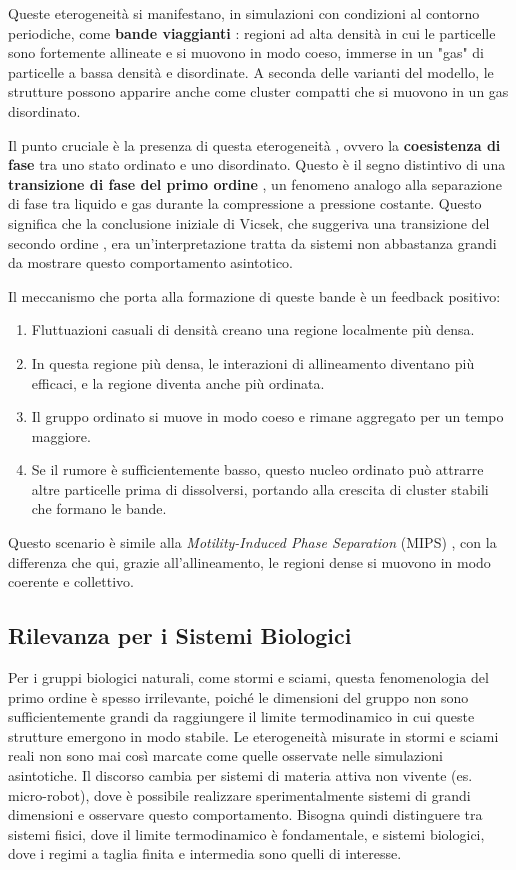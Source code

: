 Queste eterogeneità si manifestano, in simulazioni con condizioni al contorno periodiche, come \textbf{bande viaggianti} : regioni ad alta densità in cui le particelle sono fortemente allineate e si muovono in modo coeso, immerse in un "gas" di particelle a bassa densità e disordinate. A seconda delle varianti del modello, le strutture possono apparire anche come cluster compatti che si muovono in un gas disordinato.

Il punto cruciale è la presenza di questa eterogeneità , ovvero la \textbf{coesistenza di fase} tra uno stato ordinato e uno disordinato. Questo è il segno distintivo di una \textbf{transizione di fase del primo ordine} , un fenomeno analogo alla separazione di fase tra liquido e gas durante la compressione a pressione costante. Questo significa che la conclusione iniziale di Vicsek, che suggeriva una transizione del secondo ordine , era un'interpretazione tratta da sistemi non abbastanza grandi da mostrare questo comportamento asintotico.

Il meccanismo che porta alla formazione di queste bande è un feedback positivo:
\begin{enumerate}
    \item Fluttuazioni casuali di densità creano una regione localmente più densa.
    \item In questa regione più densa, le interazioni di allineamento diventano più efficaci, e la regione diventa anche più ordinata.
    \item Il gruppo ordinato si muove in modo coeso e rimane aggregato per un tempo maggiore.
    \item Se il rumore è sufficientemente basso, questo nucleo ordinato può attrarre altre particelle prima di dissolversi, portando alla crescita di cluster stabili che formano le bande.
\end{enumerate}
Questo scenario è simile alla \textit{Motility-Induced Phase Separation} (MIPS) , con la differenza che qui, grazie all'allineamento, le regioni dense si muovono in modo coerente e collettivo.

\subsection{Rilevanza per i Sistemi Biologici}
Per i gruppi biologici naturali, come stormi e sciami, questa fenomenologia del primo ordine è spesso irrilevante, poiché le dimensioni del gruppo non sono sufficientemente grandi da raggiungere il limite termodinamico in cui queste strutture emergono in modo stabile. Le eterogeneità misurate in stormi e sciami reali non sono mai così marcate come quelle osservate nelle simulazioni asintotiche. Il discorso cambia per sistemi di materia attiva non vivente (es. micro-robot), dove è possibile realizzare sperimentalmente sistemi di grandi dimensioni e osservare questo comportamento. Bisogna quindi distinguere tra sistemi fisici, dove il limite termodinamico è fondamentale, e sistemi biologici, dove i regimi a taglia finita e intermedia sono quelli di interesse.


